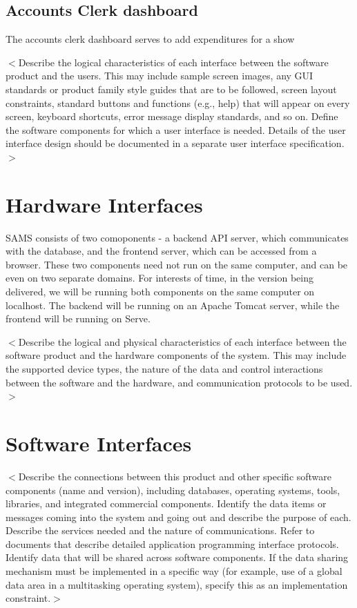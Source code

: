 \documentclass{scrreprt}
\begin{document}
\subsection{Accounts Clerk dashboard}
The accounts clerk dashboard serves to add expenditures for a show

$<$Describe the logical characteristics of each interface between the software 
product and the users. This may include sample screen images, any GUI standards 
or product family style guides that are to be followed, screen layout 
constraints, standard buttons and functions (e.g., help) that will appear on 
every screen, keyboard shortcuts, error message display standards, and so on.  
Define the software components for which a user interface is needed. Details of 
the user interface design should be documented in a separate user interface 
specification.$>$

\section{Hardware Interfaces}
SAMS consists of two comoponents - a backend API server, which communicates with the database, and the frontend server, which can be accessed from a browser. These two components need not run on the same computer, and can be even on two separate domains. For interests of time, in the version being delivered, we will be running both components on the same computer on localhost. The backend will be running on an Apache Tomcat server, while the frontend will be running on Serve.

$<$Describe the logical and physical characteristics of each interface between 
the software product and the hardware components of the system. This may include 
the supported device types, the nature of the data and control interactions 
between the software and the hardware, and communication protocols to be 
used.$>$

\section{Software Interfaces}
$<$Describe the connections between this product and other specific software 
components (name and version), including databases, operating systems, tools, 
libraries, and integrated commercial components. Identify the data items or 
messages coming into the system and going out and describe the purpose of each.  
Describe the services needed and the nature of communications. Refer to 
documents that describe detailed application programming interface protocols.  
Identify data that will be shared across software components. If the data 
sharing mechanism must be implemented in a specific way (for example, use of a 
global data area in a multitasking operating system), specify this as an 
implementation constraint.$>$
\end{document}
